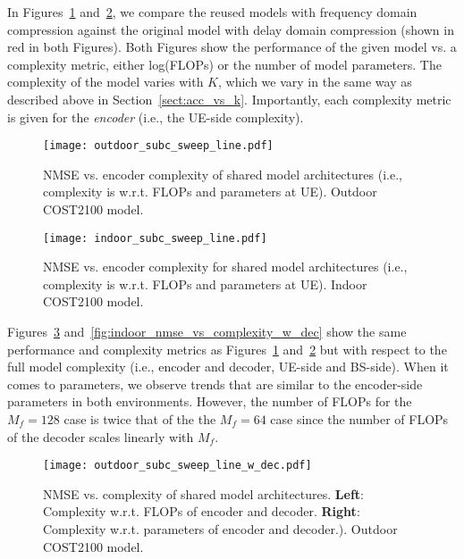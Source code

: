 In Figures~\ref{fig:outdoor_nmse_vs_complexity} and~\ref{fig:indoor_nmse_vs_complexity}, we compare the reused models with frequency domain compression against the original model with delay domain compression (shown in {\color{red}red} in both Figures). Both Figures show the performance of the given model vs. a complexity metric, either log(FLOPs) or the number of model parameters. The complexity of the model varies with $K$, which we vary in the same way as described above in Section~\ref{sect:acc_vs_k}. Importantly, each complexity metric is given for the \emph{encoder} (i.e., the UE-side complexity).

\begin{figure}[!hbtp]
    \centering
    \texttt{[image: outdoor\_subc\_sweep\_line.pdf]}
    \caption{NMSE vs. encoder complexity of shared model architectures (i.e., complexity is w.r.t. FLOPs and parameters at UE). Outdoor COST2100 model.}
    \label{fig:outdoor_nmse_vs_complexity}
\end{figure}

\begin{figure}[!hbtp]
    \centering
    \texttt{[image: indoor\_subc\_sweep\_line.pdf]}
    \caption{NMSE vs. encoder complexity for shared model architectures (i.e., complexity is w.r.t. FLOPs and parameters at UE). Indoor COST2100 model.}
    \label{fig:indoor_nmse_vs_complexity}
\end{figure}

Figures~\ref{fig:outdoor_nmse_vs_complexity_w_dec} and~\ref{fig:indoor_nmse_vs_complexity_w_dec} show the same performance and complexity metrics as Figures~\ref{fig:outdoor_nmse_vs_complexity} and~\ref{fig:indoor_nmse_vs_complexity} but with respect to the full model complexity (i.e., encoder and decoder, UE-side and BS-side). When it comes to parameters, we observe trends that are similar to the encoder-side parameters in both environments. However, the number of FLOPs for the $M_f=128$ case is twice that of the the $M_f=64$ case since the number of FLOPs of the decoder scales linearly with $M_f$.

\begin{figure}[!hbtp]
    \centering
    \texttt{[image: outdoor\_subc\_sweep\_line\_w\_dec.pdf]}
    \caption{NMSE vs. complexity of shared model architectures. \textbf{Left}: Complexity w.r.t. FLOPs of encoder and decoder. \textbf{Right}: Complexity w.r.t. parameters of encoder and decoder.). Outdoor COST2100 model.}
    \label{fig:outdoor_nmse_vs_complexity_w_dec}
\end{figure}

